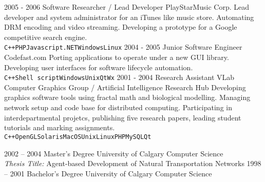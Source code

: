 \documentclass[9pt]{developercv} %
\begin{document}
\begin{entrylist}
	\entry
		{2005 - 2006}
		{Software Researcher / Lead Developer}
		{PlayStarMusic Corp.}
		{Lead developer and system administrator for an iTunes like music store. Automating DRM encoding and video streaming. Developing a prototype for a Google competitive search engine.
\\ \texttt{C++}\slashsep\texttt{PHP}\slashsep\texttt{Javascript}\slashsep\texttt{.NET}\slashsep\texttt{Windows}\slashsep\texttt{Linux}}
	\entry
		{2004 - 2005}
		{Junior Software Engineer}
		{Codefast.com }
		{Porting applications to operate under a new GUI library. Developing user interfaces for software lifecycle automation.\\ \texttt{C++}\slashsep\texttt{Shell script}\slashsep\texttt{Windows}\slashsep\texttt{Unix}\slashsep\texttt{Qt}\slashsep\texttt{Wx}}
	\entry
		{2001 - 2004}
		{Research Assistant}
		{VLab Computer Graphics Group / Artificial Intelligence Research Hub}
		{Developing graphics software tools using fractal math and biological modelling. Managing network setup and code base for distributed computing. Participating in interdepartmental projetcs, publishing five research papers, leading student tutorials and marking assignments.\\ \texttt{C++}\slashsep\texttt{OpenGL}\slashsep\texttt{Solaris}\slashsep\texttt{MacOS}\slashsep\texttt{Unix}\slashsep\texttt{Linux}\slashsep\texttt{PHP}\slashsep\texttt{MySQL}\slashsep\texttt{Qt}}
\end{entrylist}



\begin{entrylist}
	\entry
		{2002 -- 2004}
		{Master's Degree}
		{University of Calgary}
		{Computer Science\\\footnotesize{{\sl Thesis Title:} Agent-based Development of Natural Transportation Networks}}
	\entry
		{1998 -- 2001}
		{Bachelor's Degree}
		{University of Calgary}
		{Computer Science}
\end{entrylist}

\end{document}
